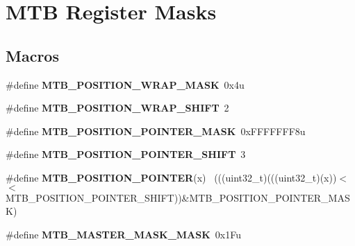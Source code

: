 \hypertarget{group___m_t_b___register___masks}{}\section{M\+T\+B Register Masks}
\label{group___m_t_b___register___masks}
\subsection*{Macros}
\begin{DoxyCompactItemize}
\item 
\hypertarget{group___m_t_b___register___masks_ga78e2e577559e338f1c3b58cc1cc63805}{}\#define {\bfseries M\+T\+B\+\_\+\+P\+O\+S\+I\+T\+I\+O\+N\+\_\+\+W\+R\+A\+P\+\_\+\+M\+A\+S\+K}~0x4u\label{group___m_t_b___register___masks_ga78e2e577559e338f1c3b58cc1cc63805}

\item 
\hypertarget{group___m_t_b___register___masks_gab3f7a88c57218b9c54796e7d2f41ac2f}{}\#define {\bfseries M\+T\+B\+\_\+\+P\+O\+S\+I\+T\+I\+O\+N\+\_\+\+W\+R\+A\+P\+\_\+\+S\+H\+I\+F\+T}~2\label{group___m_t_b___register___masks_gab3f7a88c57218b9c54796e7d2f41ac2f}

\item 
\hypertarget{group___m_t_b___register___masks_gadb8fe67da29e5443d81624d913c6a5da}{}\#define {\bfseries M\+T\+B\+\_\+\+P\+O\+S\+I\+T\+I\+O\+N\+\_\+\+P\+O\+I\+N\+T\+E\+R\+\_\+\+M\+A\+S\+K}~0x\+F\+F\+F\+F\+F\+F\+F8u\label{group___m_t_b___register___masks_gadb8fe67da29e5443d81624d913c6a5da}

\item 
\hypertarget{group___m_t_b___register___masks_ga7857f68d5a75794dbf744b3c484f782f}{}\#define {\bfseries M\+T\+B\+\_\+\+P\+O\+S\+I\+T\+I\+O\+N\+\_\+\+P\+O\+I\+N\+T\+E\+R\+\_\+\+S\+H\+I\+F\+T}~3\label{group___m_t_b___register___masks_ga7857f68d5a75794dbf744b3c484f782f}

\item 
\hypertarget{group___m_t_b___register___masks_gaa861063b1241cda928116240e2c8a7fd}{}\#define {\bfseries M\+T\+B\+\_\+\+P\+O\+S\+I\+T\+I\+O\+N\+\_\+\+P\+O\+I\+N\+T\+E\+R}(x)                                ~(((uint32\+\_\+t)(((uint32\+\_\+t)(x))$<$$<$M\+T\+B\+\_\+\+P\+O\+S\+I\+T\+I\+O\+N\+\_\+\+P\+O\+I\+N\+T\+E\+R\+\_\+\+S\+H\+I\+F\+T))\&M\+T\+B\+\_\+\+P\+O\+S\+I\+T\+I\+O\+N\+\_\+\+P\+O\+I\+N\+T\+E\+R\+\_\+\+M\+A\+S\+K)\label{group___m_t_b___register___masks_gaa861063b1241cda928116240e2c8a7fd}

\item 
\hypertarget{group___m_t_b___register___masks_ga718f776541b94b2e942aac9479a60963}{}\#define {\bfseries M\+T\+B\+\_\+\+M\+A\+S\+T\+E\+R\+\_\+\+M\+A\+S\+K\+\_\+\+M\+A\+S\+K}~0x1\+Fu\label{group___m_t_b___register___masks_ga718f776541b94b2e942aac9479a60963}


\end{DoxyCompactItemize}

